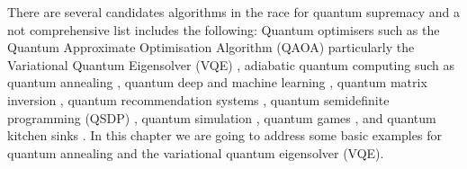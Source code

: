There are several candidates algorithms in the race for quantum supremacy and a not comprehensive list includes the following: Quantum optimisers such as the Quantum Approximate Optimisation Algorithm (QAOA) \cite{QAOA1,QAOA2,QAOA3} particularly the Variational Quantum Eigensolver (VQE) \cite{ES1,ES2}, adiabatic quantum computing such as quantum annealing \cite{AQC}, quantum deep and machine learning \cite{QML1,QML2}, quantum matrix inversion \cite{QMatrixInversion}, quantum recommendation systems \cite{QRecommendation}, quantum semidefinite programming (QSDP) \cite{QSDP1,QSDP2}, quantum simulation \cite{QS1}, quantum games \cite{JW2018}, and quantum kitchen sinks \cite{QKitchenSinks2018}. In this chapter we are going to address some basic examples for quantum annealing and the variational quantum eigensolver (VQE).  %






